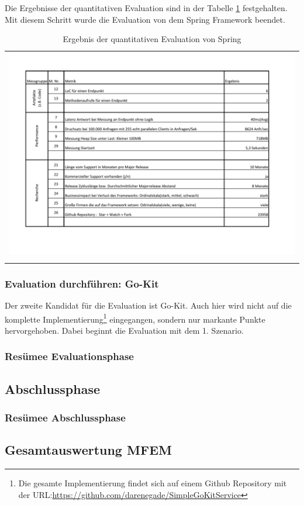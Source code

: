 Die Ergebnisse der quantitativen Evaluation sind in der Tabelle \ref{QuantErgebnisSpring} festgehalten. Mit diesem Schritt wurde die Evaluation von dem Spring Framework beendet.  

\begin{longtable}{c}
	\includegraphics[width=\linewidth]{Bilder/ObjekEvalErgebnisSpring.pdf} \\	
	\caption[Quantitative Evaluation Ergebnis Spring]{Ergebnis der quantitativen Evaluation von Spring}
	\label{QuantErgebnisSpring}\\
\end{longtable}
\FloatBarrier

\subsubsection{Evaluation durchführen: Go-Kit}
Der zweite Kandidat für die Evaluation ist Go-Kit. Auch hier wird nicht auf die komplette Implementierung\footnote{
	Die gesamte Implementierung findet sich auf einem Github Repository mit der URL:\url{https://github.com/darenegade/SimpleGoKitService}
} 
 eingegangen, sondern nur markante Punkte hervorgehoben. Dabei beginnt die Evaluation mit dem 1. Szenario.




\subsubsection{Resümee Evaluationsphase}

\subsection{Abschlussphase}
\subsubsection{Resümee Abschlussphase}


\subsection{Gesamtauswertung \ac*{MFEM}}




